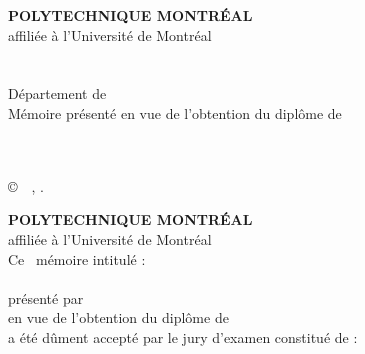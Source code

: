 {\addtocounter{page}{1}}{}
\thispagestyle{empty}%
\begin{center}%
\textbf{POLYTECHNIQUE MONTRÉAL}\\
affiliée à l'Université de Montréal\\
\textbf{\monTitre}\\
\textbf{\MakeUppercase{\monPrenom~\monNom}}\\
Département de~{\monDepartement}\\
Mémoire présenté en vue de l'obtention du diplôme de~\emph{\monDipl}\\
\maDiscipline\\
\vskip 0.4in
\moisDepot~\anneeDepot
\end{center}%
\copyright~\monPrenom~\monNom, \anneeDepot.
\newpage\thispagestyle{empty}%
\begin{center}%

\textbf{POLYTECHNIQUE MONTRÉAL}\\
affiliée à l'Université de Montréal\\
Ce ~mémoire intitulé :\\
\textbf{\monTitre}\\
présenté par~\textbf{\mbox{\monPrenom~\MakeUppercase{\monNom}}}\\
en vue de l'obtention du diplôme de~\emph{\mbox{\monDipl}}\\
a été dûment accepté par le jury d'examen constitué de :\end{center}
\monJury

